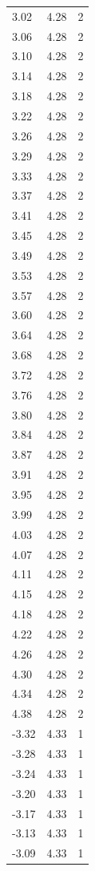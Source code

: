 \begin{longtable}{lrr}
  3.02 & 4.28 & 2 \\
  3.06 & 4.28 & 2 \\
  3.10 & 4.28 & 2 \\
  3.14 & 4.28 & 2 \\
  3.18 & 4.28 & 2 \\
  3.22 & 4.28 & 2 \\
  3.26 & 4.28 & 2 \\
  3.29 & 4.28 & 2 \\
  3.33 & 4.28 & 2 \\
  3.37 & 4.28 & 2 \\
  3.41 & 4.28 & 2 \\
  3.45 & 4.28 & 2 \\
  3.49 & 4.28 & 2 \\
  3.53 & 4.28 & 2 \\
  3.57 & 4.28 & 2 \\
  3.60 & 4.28 & 2 \\
  3.64 & 4.28 & 2 \\
  3.68 & 4.28 & 2 \\
  3.72 & 4.28 & 2 \\
  3.76 & 4.28 & 2 \\
  3.80 & 4.28 & 2 \\
  3.84 & 4.28 & 2 \\
  3.87 & 4.28 & 2 \\
  3.91 & 4.28 & 2 \\
  3.95 & 4.28 & 2 \\
  3.99 & 4.28 & 2 \\
  4.03 & 4.28 & 2 \\
  4.07 & 4.28 & 2 \\
  4.11 & 4.28 & 2 \\
  4.15 & 4.28 & 2 \\
  4.18 & 4.28 & 2 \\
  4.22 & 4.28 & 2 \\
  4.26 & 4.28 & 2 \\
  4.30 & 4.28 & 2 \\
  4.34 & 4.28 & 2 \\
  4.38 & 4.28 & 2 \\
  -3.32 & 4.33 & 1 \\
  -3.28 & 4.33 & 1 \\
  -3.24 & 4.33 & 1 \\
  -3.20 & 4.33 & 1 \\
  -3.17 & 4.33 & 1 \\
  -3.13 & 4.33 & 1 \\
  -3.09 & 4.33 & 1 \\

\end{longtable}
